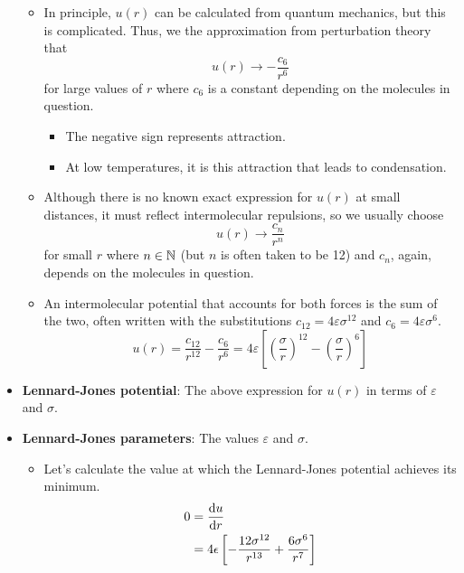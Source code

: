 \documentclass[../notes.tex]{subfiles}
\begin{document}
\begin{itemize}
\begin{itemize}
        \item In principle, $u(r)$ can be calculated from quantum mechanics, but this is complicated. Thus, we the approximation from perturbation theory that
        \begin{equation*}
            u(r) \to -\frac{c_6}{r^6}
        \end{equation*}
        for large values of $r$ where $c_6$ is a constant depending on the molecules in question.
        \begin{itemize}
            \item The negative sign represents attraction.
            \item At low temperatures, it is this attraction that leads to condensation.
        \end{itemize}
        \item Although there is no known exact expression for $u(r)$ at small distances, it must reflect intermolecular repulsions, so we usually choose
        \begin{equation*}
            u(r) \to \frac{c_n}{r^n}
        \end{equation*}
        for small $r$ where $n\in\mathbb{N}$ (but $n$ is often taken to be 12) and $c_n$, again, depends on the molecules in question.
        \item An intermolecular potential that accounts for both forces is the sum of the two, often written with the substitutions $c_{12}=4\varepsilon\sigma^{12}$ and $c_6=4\varepsilon\sigma^6$.
        \begin{equation*}
            u(r) = \frac{c_{12}}{r^{12}}-\frac{c_6}{r^6}
            = 4\varepsilon\left[ \left( \frac{\sigma}{r} \right)^{12}-\left( \frac{\sigma}{r} \right)^6 \right]
        \end{equation*}
    \end{itemize}
    \item \textbf{Lennard-Jones potential}: The above expression for $u(r)$ in terms of $\varepsilon$ and $\sigma$.
    \item \textbf{Lennard-Jones parameters}: The values $\varepsilon$ and $\sigma$.
    \begin{itemize}
        \item Let's calculate the value at which the Lennard-Jones potential achieves its minimum.
        \begin{align*}
            0 &= \dv{u}{r}\\
            &= 4\epsilon\left[ -\frac{12\sigma^{12}}{r^{13}}+\frac{6\sigma^6}{r^7} \right]\\

\end{align*}
\end{itemize}
\end{itemize}
\end{document}
